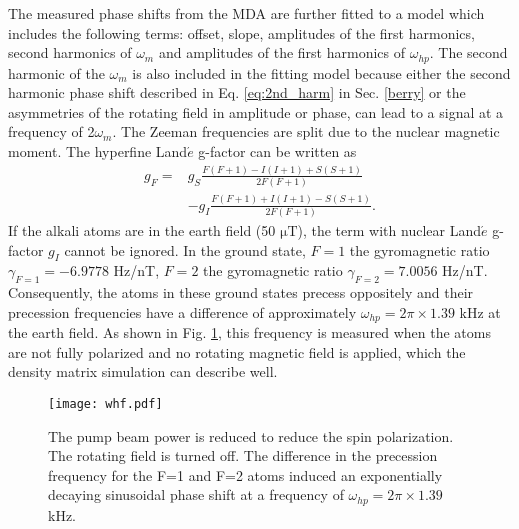 \documentclass[prx,twocolumn,10pt,nofootinbib]{revtex4-1}
\begin{document}
The measured phase shifts from the MDA are further fitted to a model which includes the following terms: offset, slope, amplitudes of the first harmonics, second harmonics of $\omega_m$ and amplitudes of the first harmonics of $\omega_{hp}$. The second harmonic of the $\omega_m$ is also included in the fitting model because either the second harmonic phase shift described in Eq. \ref{eq:2nd_harm} in Sec. \ref{berry} or the asymmetries of the rotating field in amplitude or phase, can lead to a signal at a frequency of 2$\omega_m$. The Zeeman frequencies are split due to the nuclear magnetic moment. The hyperfine Land$\acute{e}$ g-factor can be written as \cite{auzinsh2010optically}
\begin{equation}
\begin{aligned}
	g_F= &g_S\frac{F(F+1)-I(I+1)+S(S+1)}{2F(F+1)}\\
	& -g_I \frac{F(F+1)+I(I+1)-S(S+1)}{2F(F+1)}.
\end{aligned}
\end{equation}
If the alkali atoms are in the earth field (50 $\mathrm{\mu T}$), the term with nuclear Land$\acute{e}$ g-factor $g_I$ cannot be ignored. In the ground state, $F=1$ the gyromagnetic ratio $\gamma_{F=1}=-6.9778$ Hz/nT, $F=2$ the gyromagnetic ratio $\gamma_{F=2}=7.0056$ Hz/nT. Consequently, the atoms in these ground states precess oppositely and their precession frequencies have a difference of approximately $\omega_{hp} =2\pi \times 1.39$ kHz at the earth field. As shown in Fig. \ref{fig:whf}, this frequency is measured when the atoms are not fully polarized and no rotating magnetic field is applied, which the density matrix simulation can describe well.

\begin{figure}
\texttt{[image: whf.pdf]}
\caption{The pump beam power is reduced to reduce the spin polarization. The rotating field is turned off. The difference in the precession frequency for the F=1 and F=2 atoms induced an exponentially decaying sinusoidal phase shift at a frequency of $\omega_{hp} = 2 \pi \times 1.39$ kHz.}
\label{fig:whf}	
\end{figure}
\end{document}
